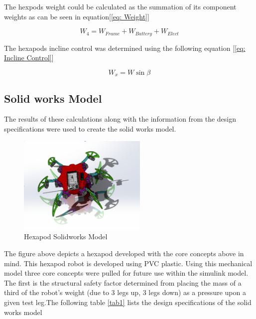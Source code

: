 The hexpods weight could be calculated as the summation of its component weights as can be seen in equation[\ref{eq: Weight}]

\begin{equation} \label{eq: Weight}
W_4 = W_{Frame}+W_{Battery}+W_{Elect}
\end{equation}


The hexapods incline control was determined using the following equation [\ref{eq: Incline Control}]

\begin{equation} \label{eq: Incline Control}
W_x = W \sin \beta
\end{equation}



\subsection{Solid works Model}
The results of these calculations along with the information from the design specifications were used to create the solid works model.

\begin{figure}[h]
 \centering
   \includegraphics[width = 0.55\textwidth]{figures/3.png}                \caption{Hexapod Solidworks Model}
   \label{fig:Physical Model }
\end{figure}

The figure above depicts a hexapod developed with the core concepts above in mind. This hexapod robot is developed using PVC plastic. Using this mechanical model three core concepts were pulled for future use within the simulink model. The first is the structural safety factor determined from placing the mass of a third of the robot's weight (due to 3 legs up, 3 legs down) as a pressure upon a given test leg.The following table \ref{tab1} lists the design specifications of the solid works model


